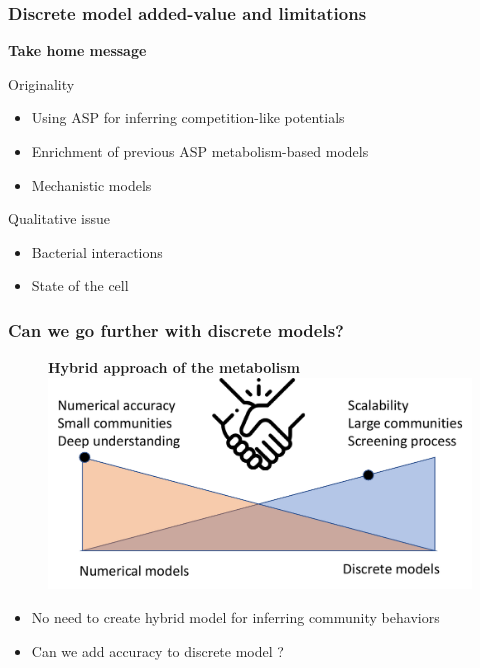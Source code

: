 \documentclass[8pt,usenames,dvipsnames]{beamer}
\begin{document}
\begin{frame}
\frametitle{Discrete model added-value and limitations}
\centering
\textbf{\huge Take home message}

\begin{minipage}{0.45\textwidth}
\begin{block}{Originality}
\begin{itemize}
\item Using ASP for inferring competition-like potentials %
\item Enrichment of previous ASP metabolism-based models
\item Mechanistic models 
\end{itemize}
\end{block} %
\end{minipage}\hfill
\hspace{0.5cm}
\hfill
\begin{minipage}{0.45\textwidth}
\begin{block}{Qualitative issue}
\begin{itemize}
\item Bacterial interactions
\item State of the cell
\end{itemize}
\end{block}
\end{minipage}

\end{frame}

\begin{frame}
\frametitle{Can we go further with discrete models?}
\begin{figure}
\textbf{Hybrid approach of the metabolism}
\includegraphics[width=\textwidth]{figures/further-discrete.pdf}
\end{figure}
\begin{block}{}
\begin{itemize}
\item No need to create hybrid model for inferring community behaviors
\item Can we add accuracy to discrete model ?
\end{itemize}
\end{block}
\end{frame}
\end{document}
